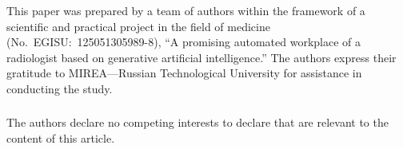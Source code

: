 \documentclass[runningheads]{llncs}
\begin{document}
%
\begin{credits}
\subsubsection{\ackname}
This paper was prepared by a team of authors within the framework of a scientific and practical project in the field of medicine (No.~EGISU:~125051305989-8), ``A promising automated workplace of a radiologist based on generative artificial intelligence.'' The authors express their gratitude to MIREA---Russian Technological University for assistance in conducting the study.

\subsubsection{\discintname}
The authors declare no competing interests to declare that are relevant to the content of this article.
\end{credits}
%
%

\end{document}
